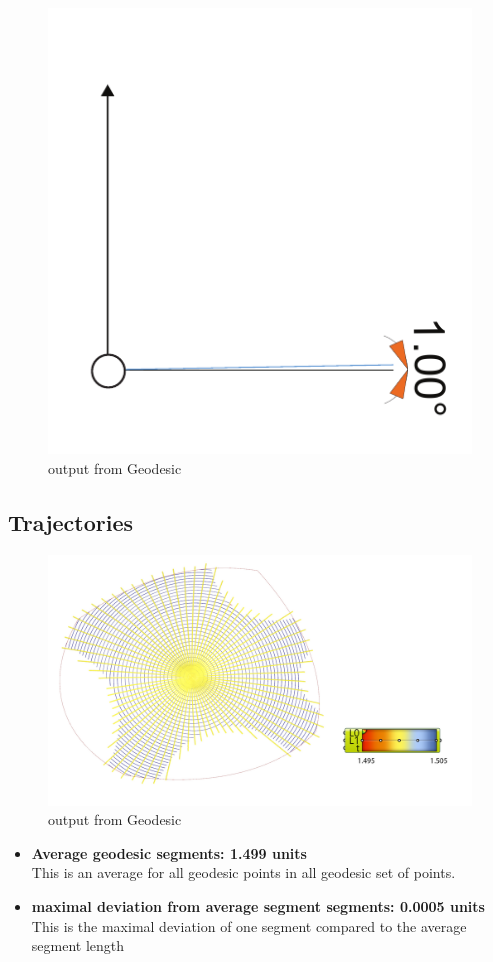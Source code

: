 \begin{figure}[H]
\centering
\includegraphics[width=0.6\linewidth ]{figure/Results/angle.pdf}
\caption{output from Geodesic}
\end{figure}

\subsection{Trajectories}

\begin{figure}[H]
\centering
\includegraphics[width=1.0\linewidth ]{figure/Results/langthsgrad.jpg}
\caption{output from Geodesic}
\end{figure}


\begin{itemize}
    
    \item \textbf{Average geodesic segments: 1.499 units }\\
    This is an average for all geodesic points in all geodesic set of points.
    \item \textbf{maximal deviation from average segment segments:  0.0005 units }\\
    This is the maximal deviation of one segment compared to the average segment length
   

  
\end{itemize}







